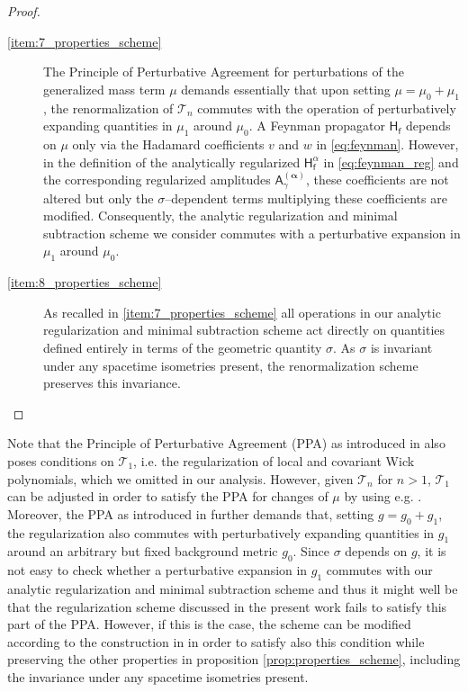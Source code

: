 \documentclass[11pt]{book}
\newcommand{\alphabd}{\boldsymbol{\alpha}}
\newcommand{\Tcal}{\mathcal{T}}
\newcommand{\Asf}{\mathsf{A}}
\newcommand{\Hsf}{\mathsf{H}}
\newcommand{\fsf}{\mathsf{f}}
\theoremstyle{break}
\begin{document}
\begin{proof}
\begin{description}
\item[\ref{item:7_properties_scheme}] The Principle of Perturbative Agreement for perturbations of the generalized mass term $\mu$ demands essentially that upon setting $\mu=\mu_0 + \mu_1$, the renormalization of $\Tcal_n$ commutes with the operation of perturbatively expanding quantities in $\mu_1$ around $\mu_0$. A Feynman propagator $\Hsf_\fsf$ depends on $\mu$ only via the Hadamard coefficients $v$ and $w$ in \eqref{eq:feynman}. However, in the definition of the analytically regularized $\Hsf^{\alpha}_\fsf$ in \eqref{eq:feynman_reg} and the corresponding regularized amplitudes $\Asf^{(\alphabd)}_\gamma$, these coefficients are not altered but only the $\sigma$--dependent terms multiplying these coefficients are modified. Consequently, the analytic regularization and minimal subtraction scheme we consider commutes with a perturbative expansion in $\mu_1$ around $\mu_0$.
%
%
%
%
\item[\ref{item:8_properties_scheme}] As recalled in \ref{item:7_properties_scheme} all operations in our analytic regularization and minimal subtraction scheme act directly on quantities defined entirely in terms of the geometric quantity $\sigma$. As $\sigma$ is invariant under any spacetime isometries present, the renormalization scheme preserves this invariance.
%
%
%
%
\end{description}
\end{proof}


Note that the Principle of Perturbative Agreement (PPA) as introduced in \cite{HW_2005} also poses conditions on $\Tcal_1$, i.e. the regularization of local and covariant Wick polynomials, which we omitted in our analysis. However, given $\Tcal_n$ for $n>1$, $\Tcal_1$ can be adjusted in order to satisfy the PPA for changes of $\mu$ by using e.g. \cite[Theorem 3.3]{DHP_2015}. Moreover, the PPA as introduced in \cite{HW_2005} further demands that, setting $g = g_0 + g_1$, the regularization also commutes with perturbatively expanding quantities in $g_1$ around an arbitrary but fixed background metric $g_0$. Since $\sigma$ depends on $g$, it is not easy to check whether a perturbative expansion in $g_1$ commutes with our analytic regularization and minimal subtraction scheme and thus it might well be that the regularization scheme discussed in the present work fails to satisfy this part of the PPA. However, if this is the case, the scheme can be modified according to the construction in \cite{HW_2005} in order to satisfy also this condition while preserving the other properties in proposition \ref{prop:properties_scheme}, including the invariance under any spacetime isometries present.
\end{document}
